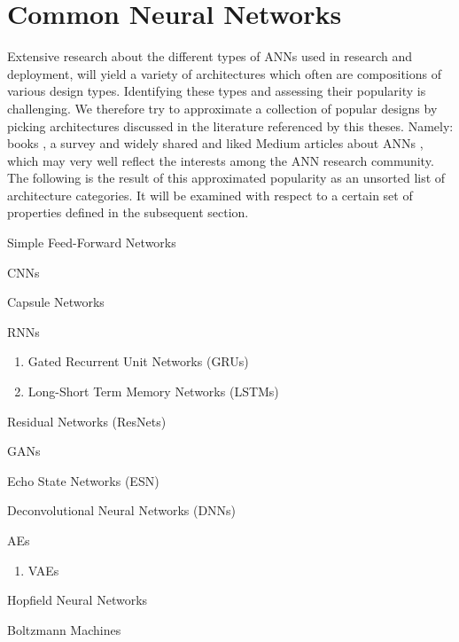 \section{Common Neural Networks}

Extensive research about the different types of \acp{ANN} used in research and deployment, will yield a variety of architectures
which often are compositions of various design types. 
Identifying these types and assessing their popularity is challenging.
We therefore try to approximate a collection of popular designs by 
picking architectures discussed in the literature referenced by this theses.
Namely: books \cite{Goodfellow-et-al-2016}\cite{Patterson-Gibson-2017}\cite{nielsenneural}, a survey \cite{2_ANN-survey_2017} and widely shared and liked Medium articles about \acp{ANN} \cite{5_11-essential-NNs_2020}
\cite{6_10-NN-architectures_2018}, which may very well reflect the interests among the \acs{ANN} research community.
The following is the result of this approximated popularity as an unsorted list of architecture categories.
It will be examined with respect to 
a certain set of properties defined in the subsequent section.\break
 
\begin{compactitem}
  \item Simple Feed-Forward Networks \cite[chapter 6]{Goodfellow-et-al-2016}
  \item \acp{CNN} \cite[chapter 9]{Goodfellow-et-al-2016}
  \item Capsule Networks
  \item \acp{RNN} \cite[chapter 10]{Goodfellow-et-al-2016}
  \begin{enumerate}
    \item Gated Recurrent Unit Networks (GRUs)
    \item Long-Short Term Memory Networks (LSTMs)
  \end{enumerate}
  \item Residual Networks (ResNets) \cite{9_deep-res-Learning_2015}
  \item \acp{GAN}
  \item Echo State Networks (ESN) \cite[section 10.8]{Goodfellow-et-al-2016}
  \item Deconvolutional Neural Networks (DNNs)
  \item \acp{AE} \cite[chapter 14]{Goodfellow-et-al-2016}
  \begin{enumerate}
      \item \acp{VAE}
  \end{enumerate}
  \item Hopfield Neural Networks 
  \item Boltzmann Machines \cite[chapter 20]{Goodfellow-et-al-2016}
\end{compactitem}
  
